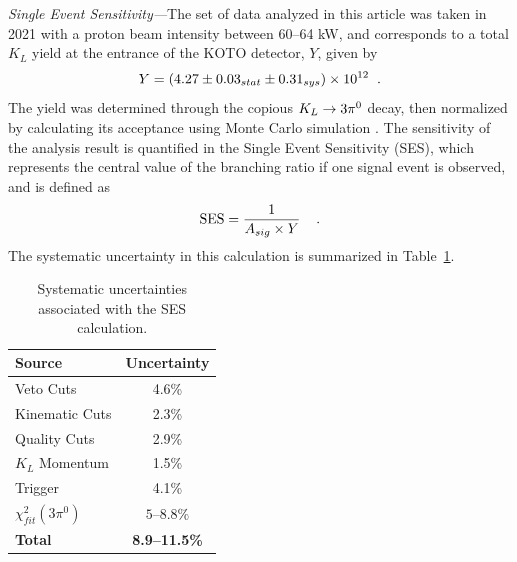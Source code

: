 \documentclass[twocolumn, superscriptaddress, aps,prl]{revtex4-2}
\begin{document}
\textit{Single Event Sensitivity---}The set of data analyzed in this article was taken in 2021 with a proton beam intensity between 60--64 kW, and corresponds to a total $K_L$ yield at the entrance of the KOTO detector, $Y$, given by
 \begin{equation}
    Y = (4.27 \pm 0.03_{stat} \pm 0.31_{sys}) \times 10^{12} \hspace{0.2cm}.
    \label{eq:3pi0_yield_result}
\end{equation}
The yield was determined through the copious $K_L \rightarrow 3\pi^0$ decay, then normalized by calculating its acceptance using Monte Carlo simulation \cite{geant4_simulation_toolkit}. The sensitivity of the analysis result is quantified in the Single Event Sensitivity (SES), which represents the central value of the branching ratio if one signal event is observed, and is defined as
\begin{equation}
    \mathrm{SES}  = \frac{1}{A_{sig}\times Y} \hspace{0.2cm} \hspace{0.2cm}.
    \label{eq:SES}
\end{equation}
The systematic uncertainty in this calculation is summarized in Table~\ref{tab:sys_error}.
\begin{table}[h]
\caption{Systematic uncertainties associated with the SES calculation. }
\begin{center}

 \begin{tabular}{|| l | c ||}
 \hline
 \textbf{Source} & Uncertainty\\
 \hline\hline
 Veto Cuts & 4.6\% \\
 \hline
 Kinematic Cuts & 2.3\%   \\
 \hline
 Quality Cuts & 2.9\%  \\
 \hline
  $K_L$ Momentum  & 1.5\%  \\
 \hline
  Trigger & 4.1\%   \\
  \hline
  $\chi^2_{fit}(3\pi^0)$ & $5\text{--}8.8 \%$ \\
 \hline
 \hline
 \textbf{Total} & \textbf{8.9--11.5\% } \\
 \hline
\end{tabular}
 \label{tab:sys_error}
\end{center}
\end{table}
\end{document}
